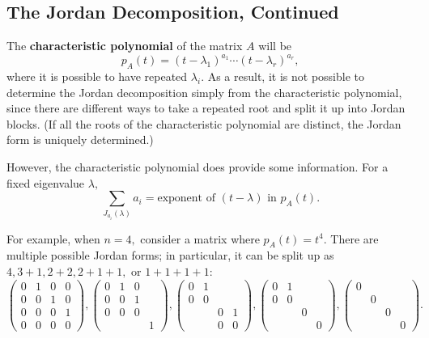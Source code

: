\subsection{The Jordan Decomposition, Continued}

The \textbf{characteristic polynomial} of the matrix $A$ will be 
\[
p_A(t) = (t-\lambda_1)^{a_1} \cdots (t - \lambda_r)^{a_r},
\]
where it is possible to have repeated $\lambda_i.$ As a result, it is not possible to determine the Jordan decomposition simply from the characteristic polynomial, since there are different ways to take a repeated root and split it up into Jordan blocks. (If all the roots of the characteristic polynomial are distinct, the Jordan form is uniquely determined.) 

However, the characteristic polynomial does provide some information. For a fixed eigenvalue $\lambda,$ 
\[
\sum_{J_{a_i}(\lambda)} a_i = \text{exponent of } (t-\lambda) \text{ in } p_A(t).
\]

\begin{example}[$n = 4$]
For example, when $n = 4,$ consider a matrix where $p_A(t) = t^4.$ There are multiple possible Jordan forms; in particular, it can be split up as $4, 3 + 1, 2 + 2, 2 + 1 + 1,$ or $1 + 1 + 1 + 1:$
\[
\begin{pmatrix}
0 & 1 & 0 & 0 \\
0 & 0 & 1 & 0 \\
0 & 0 & 0 & 1 \\
0 & 0 & 0 & 0
\end{pmatrix},
\begin{pmatrix}
0 & 1 & 0 &  \\
0 & 0 & 1 &  \\
0 & 0 & 0 &  \\
 &  &  & 1
\end{pmatrix},
\begin{pmatrix}
0 & 1 &  &  \\
0 & 0 &  &  \\
 &  & 0 & 1 \\
 &  & 0 & 0 
\end{pmatrix},
\begin{pmatrix}
0 & 1 &  &  \\
0 & 0 &  &  \\
 &  & 0 &  \\
 &  &  &  0
\end{pmatrix},
\begin{pmatrix}
0 &  &  &  \\
 & 0 &  &  \\
 &  & 0 &  \\
 &  &  & 0
\end{pmatrix}.
\]
\end{example}

